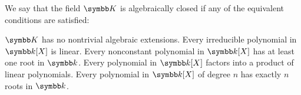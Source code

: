 \begin{definition}\label{def:algebraically_closed_field}\cite[proposition 9.20]{Knapp2016BAlg}
  We say that the field \( \K \) is algebraically closed if any of the equivalent conditions are satisfied:
  \begin{defenum}
     \( \K \) has no nontrivial algebraic extensions.
     Every irreducible polynomial in \( \k[X] \) is linear.
     Every nonconstant polynomial in \( \k[X] \) has at least one root in \( \k \).
     Every polynomial in \( \k[X] \) factors into a product of linear polynomials.
     Every polynomial in \( \k[X] \) of degree \( n \) has exactly \( n \) roots in \( \k \).
  \end{defenum}
\end{definition}
